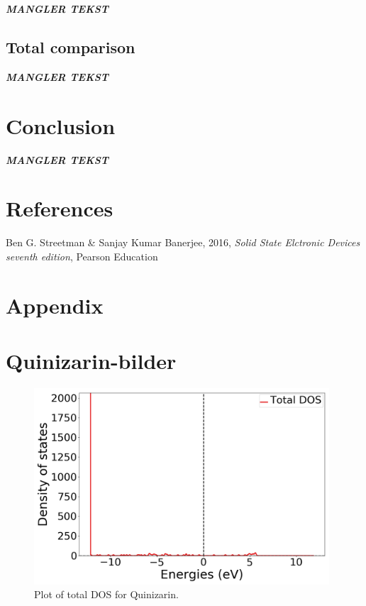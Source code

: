 \documentclass{article}
\begin{document}
    \textbf{\textit{MANGLER TEKST}}


  \subsection{Total comparison}

    \textbf{\textit{MANGLER TEKST}}




\vspace{1cm}

\section{Conclusion}    \label{sec:Conclusion}

  \textbf{\textit{MANGLER TEKST}}


\vspace{1cm}

\section{References} \label{sec:References}

    \begin{thebibliography}{}

    Ben G. Streetman \& Sanjay Kumar Banerjee, 2016, \textit{Solid State Elctronic Devices seventh edition}, Pearson Education


    \end{thebibliography}



\appendix

\section*{Appendix} \label{sec:Appendix}

\section{Quinizarin-bilder}

  \begin{figure}[H]
      \centering
      \includegraphics[width = 11cm]{../fig/basic_TDOS_1.png}
      \caption{Plot of total DOS for Quinizarin. }
      \label{fig:basic_TDOS_1}
  \end{figure}
\end{document}
